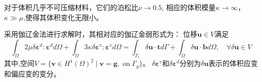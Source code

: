 对于体积几乎不可压缩材料，它们的泊松比$\nu \rightarrow 0.5$, 相应的体积模量$\kappa \rightarrow \infty$，$\kappa\gg\mu$,使得其体积变化无限小。

采用伽辽金法进行求解时，其相对应的伽辽金弱形式为：
位移$\boldsymbol u \in V$满足
\begin{equation}\label{weak_penalty}
\int_\Omega 2\mu \delta \boldsymbol \varepsilon^d : \boldsymbol \varepsilon^d d\Omega +
\int_\Omega 3\kappa \delta \boldsymbol \varepsilon^v : \boldsymbol \varepsilon^v d\Omega =
\int_{\Gamma_t} \delta \boldsymbol u \cdot \boldsymbol t d\Gamma + \int_\Omega \delta \boldsymbol u \cdot \boldsymbol b d\Omega, \quad
\forall \delta \boldsymbol u \in V
\end{equation}
其中,空间$V=\{\boldsymbol v \in H^1(\Omega)^2\;\vert\;\boldsymbol v = \boldsymbol g, \; \textrm{on} \; \Gamma_g\}$。
$\delta\boldsymbol \varepsilon^v$和$\delta\boldsymbol \varepsilon^d $分别为$\delta \boldsymbol u$表示的体积应变和偏应变的变分。


